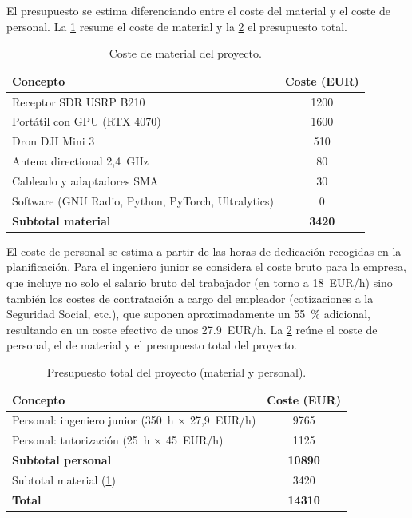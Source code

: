 El presupuesto se estima diferenciando entre el coste del material y el coste de personal. La \cref{tab:presupuesto_material} resume el coste de material y la \cref{tab:presupuesto_total} el presupuesto total.

\begin{table}[htbp]
\centering
\caption{Coste de material del proyecto.}
\label{tab:presupuesto_material}
\begin{tabular}{lc}
\toprule
\textbf{Concepto} & \textbf{Coste (EUR)} \\
\midrule
Receptor SDR USRP B210 & 1200 \\
Portátil con GPU (RTX 4070) & 1600 \\
Dron DJI Mini 3 & 510 \\
Antena directional 2,4~GHz & 80 \\
Cableado y adaptadores SMA & 30 \\
Software (GNU Radio, Python, PyTorch, Ultralytics) & 0 \\
\midrule
\textbf{Subtotal material} & \textbf{3420} \\
\bottomrule
\end{tabular}
\end{table}

El coste de personal se estima a partir de las horas de dedicación recogidas en la planificación. Para el ingeniero junior se considera el coste bruto para la empresa, que incluye no solo el salario bruto del trabajador (en torno a \SI{18}{EUR/h}) sino también los costes de contratación a cargo del empleador (cotizaciones a la Seguridad Social, etc.), que suponen aproximadamente un \SI{55}{\percent} adicional, resultando en un coste efectivo de unos \SI{27.9}{EUR/h}. La \cref{tab:presupuesto_total} reúne el coste de personal, el de material y el presupuesto total del proyecto.

\begin{table}[htbp]
\centering
\caption{Presupuesto total del proyecto (material y personal).}
\label{tab:presupuesto_total}
\begin{tabular}{lc}
\toprule
\textbf{Concepto} & \textbf{Coste (EUR)} \\
\midrule
Personal: ingeniero junior (350~h $\times$ 27,9~EUR/h) & 9765 \\
Personal: tutorización (25~h $\times$ 45~EUR/h) & 1125 \\
\textbf{Subtotal personal} & \textbf{10890} \\
\midrule
Subtotal material (\cref{tab:presupuesto_material}) & 3420 \\
\midrule
\textbf{Total} & \textbf{14310} \\
\bottomrule
\end{tabular}
\end{table}




